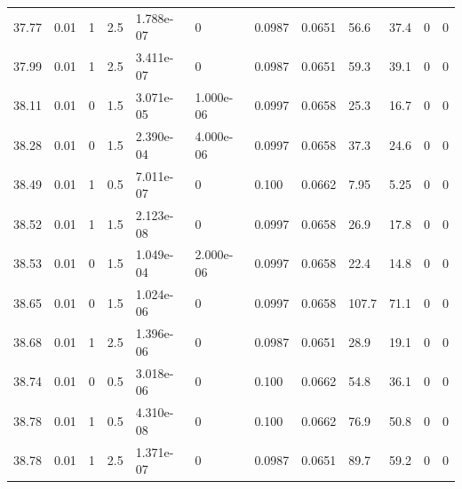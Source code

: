 \documentclass[preview]{standalone}
\begin{document}
{{{{{{{{\begin{tabular}{L{1.2cm}C{1.2cm} C{0.3cm}C{0.5cm} C{1.4cm}C{1.4cm} C{1.4cm}C{1.4cm} C{1.6cm}C{1.6cm} C{1.6cm}C{1.6cm}}
  37.77  &  0.01  & 1     & 2.5 &  1.788e-07  & 0  &  0.0987&   0.0651& 56.6 & 37.4   &  0 & 0  \\ 
  37.99  &  0.01  & 1     & 2.5 &  3.411e-07  & 0  &  0.0987&   0.0651& 59.3 & 39.1   &  0 & 0  \\ 
  38.11  &  0.01  & 0     & 1.5 &  3.071e-05  & 1.000e-06  &  0.0997&   0.0658& 25.3 & 16.7   &  0 & 0  \\ 
  38.28  &  0.01  & 0     & 1.5 &  2.390e-04  & 4.000e-06  &  0.0997&   0.0658& 37.3 & 24.6   &  0 & 0  \\ 
  38.49  &  0.01  & 1     & 0.5 &  7.011e-07  & 0  &  0.100&   0.0662& 7.95 & 5.25   &  0 & 0  \\ 
  38.52  &  0.01  & 1     & 1.5 &  2.123e-08  & 0  &  0.0997&   0.0658& 26.9 & 17.8   &  0 & 0  \\ 
  38.53  &  0.01  & 0     & 1.5 &  1.049e-04  & 2.000e-06  &  0.0997&   0.0658& 22.4 & 14.8   &  0 & 0  \\ 
  38.65  &  0.01  & 0     & 1.5 &  1.024e-06  & 0  &  0.0997&   0.0658& 107.7 & 71.1   &  0 & 0  \\ 
  38.68  &  0.01  & 1     & 2.5 &  1.396e-06  & 0  &  0.0987&   0.0651& 28.9 & 19.1   &  0 & 0  \\ 
  38.74  &  0.01  & 0     & 0.5 &  3.018e-06  & 0  &  0.100&   0.0662& 54.8 & 36.1   &  0 & 0  \\ 
  38.78  &  0.01  & 1     & 0.5 &  4.310e-08  & 0  &  0.100&   0.0662& 76.9 & 50.8   &  0 & 0  \\ 
  38.78  &  0.01  & 1     & 2.5 &  1.371e-07  & 0  &  0.0987&   0.0651& 89.7 & 59.2   &  0 & 0  \\ 
\hline 
\end{tabular} 

}}}}}}}}
\end{document}
